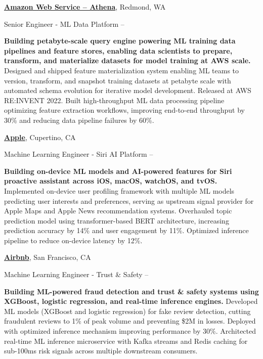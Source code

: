 \documentclass[a4paper,MMMyyyy,nonstopmode]{simpleresumecv}
\begin{document}
\begin{Body}
\BigGap
\Entry
\href{https://aws.amazon.com/athena/}
{\textbf{Amazon Web Service -- Athena}},
Redmond, WA

\Gap
\BulletItem
Senior Engineer - ML Data Platform
\hfill
{} --
\begin{Detail}
\SubBulletItem
\textbf{Building petabyte-scale query engine powering ML training data pipelines and feature stores, enabling data scientists to prepare, transform, and materialize datasets for model training at AWS scale.}
\SubBulletItem
Designed and shipped feature materialization system enabling ML teams to version, transform, and snapshot training datasets at petabyte scale with automated schema evolution for iterative model development. Released at AWS RE:INVENT 2022.
\SubBulletItem
Built high-throughput ML data processing pipeline optimizing feature extraction workflows, improving end-to-end throughput by 30\% and reducing data pipeline failures by 60\%.
\end{Detail}

\BigGap
\Entry
\href{https://www.apple.com/}
{\textbf{Apple}},
Cupertino, CA

\Gap
\BulletItem
Machine Learning Engineer - Siri AI Platform
\hfill
{} --
\begin{Detail}
\SubBulletItem
\textbf{Building on-device ML models and AI-powered features for Siri proactive assistant across iOS, macOS, watchOS, and tvOS.}
\SubBulletItem
Implemented on-device user profiling framework with multiple ML models predicting user interests and preferences, serving as upstream signal provider for Apple Maps and Apple News recommendation systems.
\SubBulletItem
Overhauled topic prediction model using transformer-based BERT architecture, increasing prediction accuracy by 14\% and user engagement by 11\%. Optimized inference pipeline to reduce on-device latency by 12\%.
\end{Detail}

\BigGap
\Entry
\href{https://press.airbnb.com/about-us/}
{\textbf{Airbnb}},
San Francisco, CA

\Gap
\BulletItem
Machine Learning Engineer - Trust \& Safety
\hfill
{} --
\begin{Detail}
\SubBulletItem
\textbf{Building ML-powered fraud detection and trust \& safety systems using XGBoost, logistic regression, and real-time inference engines.}
\SubBulletItem
Developed ML models (XGBoost and logistic regression) for fake review detection, cutting fraudulent reviews to 1\% of peak volume and preventing \$2M in losses. Deployed with optimized inference mechanism improving performance by 30\%.
\SubBulletItem
Architected real-time ML inference microservice with Kafka streams and Redis caching for sub-100ms risk signals across multiple downstream consumers.
\end{Detail}


\end{Body}
\end{document}

